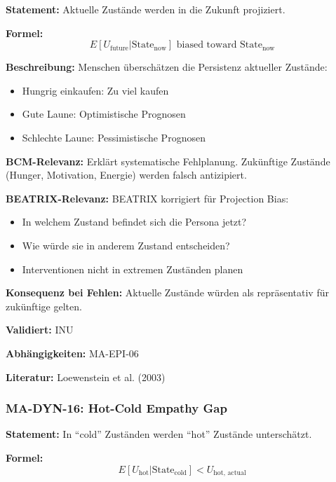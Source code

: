 \textbf{Statement:} Aktuelle Zustände werden in die Zukunft projiziert.

\textbf{Formel:}
\begin{equation}
E[U_{\text{future}}|\text{State}_{\text{now}}] \text{ biased toward State}_{\text{now}}
\end{equation}

\textbf{Beschreibung:}
Menschen überschätzen die Persistenz aktueller Zustände:
\begin{itemize}
    \item Hungrig einkaufen: Zu viel kaufen
    \item Gute Laune: Optimistische Prognosen
    \item Schlechte Laune: Pessimistische Prognosen
\end{itemize}

\textbf{BCM-Relevanz:}
Erklärt systematische Fehlplanung. Zukünftige Zustände (Hunger, Motivation, Energie) werden falsch antizipiert.

\textbf{BEATRIX-Relevanz:}
BEATRIX korrigiert für Projection Bias:
\begin{itemize}
    \item In welchem Zustand befindet sich die Persona jetzt?
    \item Wie würde sie in anderem Zustand entscheiden?
    \item Interventionen nicht in extremen Zuständen planen
\end{itemize}

\textbf{Konsequenz bei Fehlen:}
Aktuelle Zustände würden als repräsentativ für zukünftige gelten.

\textbf{Validiert:} INU

\textbf{Abhängigkeiten:} MA-EPI-06

\textbf{Literatur:} Loewenstein et al. (2003)


\subsubsection*{MA-DYN-16: Hot-Cold Empathy Gap}

\textbf{Statement:} In ``cold'' Zuständen werden ``hot'' Zustände unterschätzt.

\textbf{Formel:}
\begin{equation}
E[U_{\text{hot}}|\text{State}_{\text{cold}}] < U_{\text{hot, actual}}
\end{equation}

